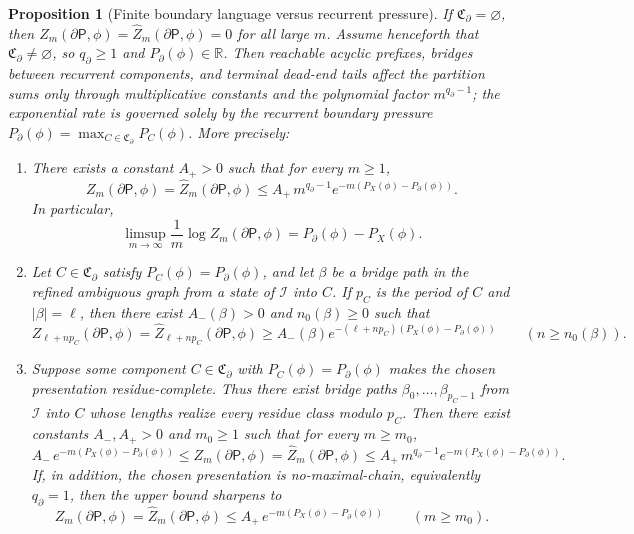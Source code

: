 \documentclass{etds}%
\numberwithin{equation}{section}
\theoremstyle{plain}
\newtheorem{proposition}[theorem]{Proposition}
\theoremstyle{definition}
\theoremstyle{remark}
\begin{document}
\begin{proposition}[Finite boundary language versus recurrent pressure]
If $\mathfrak{C}_\partial=\varnothing$, then
$Z_m(\partial\mathsf{P},\phi)=\widehat Z_m(\partial\mathsf{P},\phi)=0$ for all
large $m$.  Assume henceforth that $\mathfrak{C}_\partial\neq\varnothing$, so
$q_\partial\ge 1$ and $P_\partial(\phi)\in\mathbb{R}$.
Then reachable acyclic prefixes, bridges between recurrent components, and
terminal dead-end tails affect the partition sums only through multiplicative
constants and the polynomial factor $m^{q_\partial-1}$; the exponential rate
is governed solely by the recurrent boundary pressure
$P_\partial(\phi)=\max_{C\in\mathfrak{C}_\partial}P_C(\phi)$.  More precisely:
\begin{enumerate}[label=(\roman*)]
\item There exists a constant $A_+>0$ such that for every $m\ge 1$,
  \[
  Z_m(\partial\mathsf{P},\phi)
  =\widehat Z_m(\partial\mathsf{P},\phi)
  \le A_+\,m^{q_\partial-1}e^{-m(P_X(\phi)-P_\partial(\phi))}.
  \]
  In particular,
  \[
  \limsup_{m\to\infty}\frac1m\log Z_m(\partial\mathsf{P},\phi)
  =P_\partial(\phi)-P_X(\phi).
  \]
\item Let $C\in\mathfrak{C}_\partial$ satisfy $P_C(\phi)=P_\partial(\phi)$, and
  let $\beta$ be a bridge path in the refined ambiguous graph from a state of
  $\mathcal{I}$ into $C$.  If $p_C$ is the period of $C$ and $|\beta|=\ell$,
  then there exist $A_-(\beta)>0$ and $n_0(\beta)\ge 0$ such that
  \[
  Z_{\ell+np_C}(\partial\mathsf{P},\phi)
  =\widehat Z_{\ell+np_C}(\partial\mathsf{P},\phi)
  \ge A_-(\beta)e^{-(\ell+np_C)(P_X(\phi)-P_\partial(\phi))}
  \qquad(n\ge n_0(\beta)).
  \]
\item Suppose some component $C\in\mathfrak{C}_\partial$ with
  $P_C(\phi)=P_\partial(\phi)$ makes the chosen presentation
  residue-complete.  Thus there exist bridge paths
  $\beta_0,\dots,\beta_{p_C-1}$ from $\mathcal{I}$ into $C$ whose lengths
  realize every residue class modulo $p_C$.  Then there exist constants
  $A_-,A_+>0$ and $m_0\ge 1$ such that for every $m\ge m_0$,
  \[
  A_-\,e^{-m(P_X(\phi)-P_\partial(\phi))}
  \le Z_m(\partial\mathsf{P},\phi)
  =\widehat Z_m(\partial\mathsf{P},\phi)
  \le A_+\,m^{q_\partial-1}e^{-m(P_X(\phi)-P_\partial(\phi))}.
  \]
  If, in addition, the chosen presentation is no-maximal-chain, equivalently
  $q_\partial=1$, then the upper bound sharpens to
  \[
  Z_m(\partial\mathsf{P},\phi)
  =\widehat Z_m(\partial\mathsf{P},\phi)
  \le A_+\,e^{-m(P_X(\phi)-P_\partial(\phi))}
  \qquad(m\ge m_0).
  \]
\end{enumerate}
\end{proposition}
\end{document}

